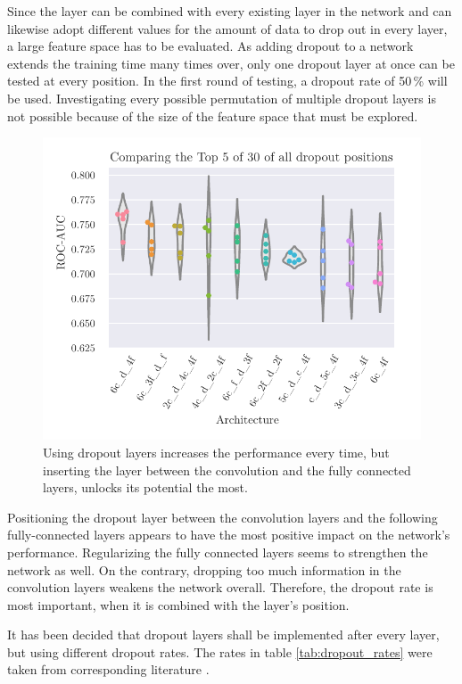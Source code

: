 Since the layer can be combined with every existing layer in the network
and can likewise adopt different values for the amount of data to drop out in every layer,
a large feature space has to be evaluated.
As adding dropout to a network extends the training time many times over,
only one dropout layer at once can be tested at every position.
In the first round of testing, a dropout rate of \num{50}\,\% will be used.
Investigating every possible permutation of multiple dropout layers is not possible
because of the size of the feature space that must be explored.

\begin{figure}
    \centering
    \includegraphics[scale=1]{Plots/Dropout_Positions.pdf}
    \caption{Using dropout layers increases the performance every time, but inserting the layer between the convolution and the fully connected layers, unlocks its potential the most.}
    \label{fig:random_dropout}
\end{figure}

Positioning the dropout layer between the convolution layers and the following fully-connected layers
appears to have the most positive impact on the network's performance.
Regularizing the fully connected layers seems to strengthen the network as well.
On the contrary, dropping too much information in the convolution layers weakens the network overall.
Therefore, the dropout rate is most important, when it is combined with the layer's position.

It has been decided that dropout layers shall be implemented after every layer, but using different dropout rates.
The rates in table \ref{tab:dropout_rates} were taken from corresponding literature \cite{deeplearning}.

